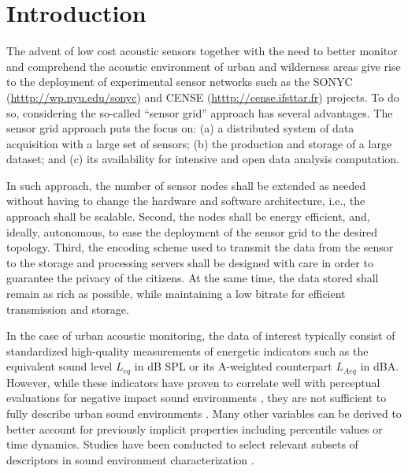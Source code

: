 \documentclass[sensors,article,accept,moreauthors,pdftex,10pt,a4paper]{mdpi}
\begin{document}


\section{Introduction}

The advent of low cost acoustic sensors together with the need to better monitor and comprehend the acoustic environment of urban and wilderness areas give rise to the deployment of experimental sensor networks such as the {SONYC} ({\url{htttp://wp.nyu.edu/sonyc}}) \cite{mydlarz2017implementation} and %
 {CENSE} ({\url{htttp://cense.ifsttar.fr}}) \cite{picault2017} projects. To do so, considering the so-called ``sensor grid'' approach  \cite{lim2005sensor,tham2005sensorgrid} has several advantages. The sensor grid approach puts the focus {on:} (a) a distributed system of data acquisition with a large set of sensors; (b) the production and storage of a large dataset; and (c) its availability for intensive and open data analysis computation.

In such approach, the number of sensor nodes shall be extended as needed without having to change the hardware and software architecture, i.e., the approach shall be scalable. Second, the nodes shall be energy efficient, {and,  ideally,} autonomous, {to} ease the deployment of the sensor grid to the desired topology. Third, the encoding scheme used to transmit the data from the sensor to the storage and processing servers shall be designed with care in order to guarantee the privacy of the citizens. At the same time, the data stored shall remain as rich as {possible,} while maintaining a low bitrate for efficient transmission and storage.

In the case of urban acoustic monitoring, the data of interest typically {consist} of standardized high-quality measurements of energetic indicators such as the equivalent sound level $L_{eq}$ in dB SPL or its A-weighted counterpart $L_{Aeq}$ in dBA. However, while these indicators have proven to correlate well with perceptual evaluations for negative impact sound environments \cite{gozalo2015}, they are not sufficient to fully describe urban sound environments \cite{rychtarikova2013}. Many other variables can be derived to better account for previously implicit properties \cite{can2016} including percentile values or time dynamics. Studies have been conducted to select relevant subsets of descriptors in sound environment characterization \cite{can2015, brocolini2013, nilsson2007}.
\end{document}
